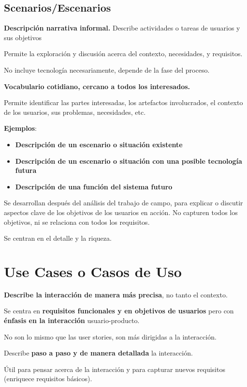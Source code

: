 \documentclass[12pt, twoside, openright]{report} %
\begin{document}
\subsection{Scenarios/Escenarios}

\textbf{Descripción narrativa informal.} Describe actividades o tareas
de usuarios y sus objetivos

Permite la exploración y discusión acerca del contexto, necesidades, y
requisitos.

No incluye tecnología necesariamente, depende de la fase del proceso.

\textbf{Vocabulario cotidiano, cercano a todos los interesados.}

Permite identificar las partes interesadas, los artefactos involucrados,
el contexto de los usuarios, sus problemas, necesidades, etc.

\textbf{Ejemplos}:

\begin{itemize}
	\item \textbf{Descripción de un escenario o situación existente}
	\item \textbf{Descripción de un escenario o situación con una posible
		      tecnología futura}
	\item \textbf{Descripción de una función del sistema futuro}
\end{itemize}

Se desarrollan después del análisis del trabajo de campo, para explicar
o discutir aspectos clave de los objetivos de los usuarios en acción. No
capturen todos los objetivos, ni se relaciona con todos los requisitos.

Se centran en el detalle y la riqueza.

\section{Use Cases o Casos de Uso}

\textbf{Describe la interacción de manera más precisa}, no tanto el
contexto.

Se centra en \textbf{requisitos funcionales y en objetivos de usuarios} pero
con \textbf{énfasis en la interacción} usuario-producto.

No son lo mismo que las user stories, son más dirigidas a la
interacción.

Describe \textbf{paso a paso y de manera detallada} la interacción.

Útil para pensar acerca de la interacción y para capturar nuevos
requisitos (enriquece requisitos básicos).
\end{document}
